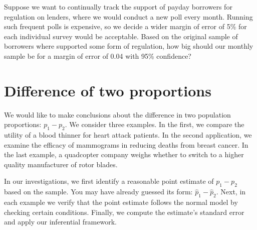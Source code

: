 
\begin{exercisewrap}
\begin{nexercise}
Suppose we want to continually track the support
of payday borrowers for regulation on lenders,
where we would conduct a new poll every month.
Running such frequent polls is expensive, so we decide
a wider margin of error of 5\% for each individual survey
would be acceptable.
Based on the original sample of borrowers where
\paydayRegPerc{} supported some form of regulation,
how big should our monthly sample be for a margin
of error of 0.04 with 95\% confidence?\footnotemark
\end{nexercise}
\end{exercisewrap}






\section{Difference of two proportions}
\label{differenceOfTwoProportions}

We would like to make conclusions about the difference
in two population proportions: \mbox{$p_1 - p_2$}.
We consider three examples.
In the first, we compare the utility of a blood thinner
for heart attack patients.
In the second application, we examine the efficacy of
mammograms in reducing deaths from breast cancer.
In the last example, a quadcopter company weighs whether
to switch to a higher quality manufacturer of rotor blades.

In our investigations, we first identify a reasonable
point estimate of $p_1 - p_2$ based on the sample.
You may have already guessed its form:
$\hat{p}_1 - \hat{p}_2$.
Next, in each example we verify that the point estimate
follows the normal model by checking certain conditions.
Finally, we compute the estimate's standard error and
apply our inferential framework.



